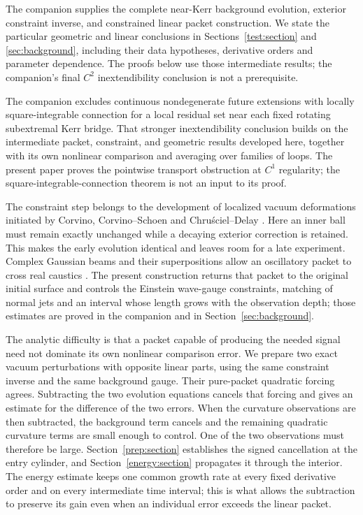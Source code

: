 The companion \cite{Foundation} supplies the complete near-Kerr
background evolution, exterior constraint inverse, and constrained
linear packet construction. We state the particular geometric and
linear conclusions in Sections~\ref{test:section} and
\ref{sec:background}, including their data hypotheses, derivative
orders and parameter dependence. The proofs below use those
intermediate results; the companion's final $C^2$ inextendibility
conclusion is not a prerequisite.

The companion \cite[Theorem~1.2]{KerrWeakConnection} excludes continuous
nondegenerate future extensions with locally square-integrable connection
for a local residual set near each fixed rotating subextremal Kerr bridge.
That stronger inextendibility conclusion builds on the intermediate packet,
constraint, and geometric results developed here, together with its own
nonlinear comparison and averaging over families of loops. The present
paper proves the pointwise transport obstruction at $C^1$ regularity;
the square-integrable-connection theorem is not an input to its proof.

The constraint step belongs to the development of localized vacuum
deformations initiated by Corvino, Corvino--Schoen and
Chru\'sciel--Delay \cite{Corvino2000,CorvinoSchoen2006,ChruscielDelay2003}.
Here an inner ball must remain exactly unchanged while a decaying
exterior correction is retained. This makes the early evolution
identical and leaves room for a late experiment. Complex Gaussian
beams and their superpositions allow an oscillatory packet to cross
real caustics \cite{Ralston1982,Tanushev2008,LiuRunborgTanushev2013}.
The present construction returns that packet to the original initial
surface and controls the Einstein wave-gauge constraints,
matching of normal jets and an interval whose length grows with the
observation depth; those estimates are proved in the companion and
in Section~\ref{sec:background}.

The analytic difficulty is that a packet capable of producing the
needed signal need not dominate its own nonlinear comparison error.
We prepare two exact vacuum perturbations with opposite linear parts,
using the same constraint inverse and the same background gauge.
Their pure-packet quadratic forcing agrees. Subtracting the two
evolution equations cancels that forcing and gives an estimate for
the difference of the two errors. When the curvature observations
are then subtracted, the background term cancels and the remaining
quadratic curvature terms are small enough to control. One of the
two observations must therefore be large. Section~\ref{prep:section}
establishes the signed cancellation at the entry cylinder, and
Section~\ref{energy:section} propagates it through the interior.
The energy estimate keeps one common growth rate at every fixed
derivative order and on every intermediate time interval; this is
what allows the subtraction to preserve its gain even when an
individual error exceeds the linear packet.

